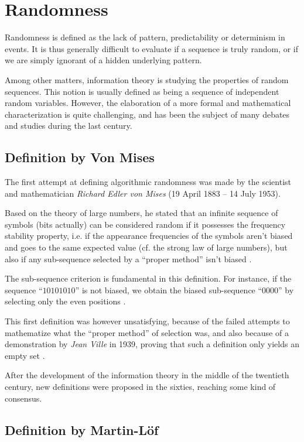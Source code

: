 \documentclass{llncs}
\begin{document}
\section{Randomness}
\label{sec:rand}


Randomness is defined as the lack of pattern, predictability or determinism in events. It is thus generally difficult to evaluate if a sequence is truly random, or if we are simply ignorant of a hidden underlying pattern.

Among other matters, information theory is studying the properties of random sequences. This notion is usually defined as being a sequence of independent random variables. However, the elaboration of a more formal and mathematical characterization is quite challenging, and has been the subject of many debates and studies during the last century.

\subsection{Definition by Von Mises}


The first attempt at defining algorithmic randomness was made by the scientist and mathematician \emph{Richard Edler von Mises} (19 April 1883 – 14 July 1953).

Based on the theory of large numbers, he stated that an infinite sequence of symbols (bits actually) can be considered random if it possesses the frequency stability property, i.e. if the appearance frequencies of the symbols aren't biased and goes to the same expected value (cf. the strong law of large numbers), but also if any sub-sequence selected by a ``proper method'' isn't biased \cite{down}.

The sub-sequence criterion is fundamental in this definition. For instance, if the sequence “$10101010$” is not biased, we obtain the biased sub-sequence “$0000$” by selecting only the even positions \cite{down}.

This first definition was however unsatisfying, because of the failed attempts to mathematize what the “proper method” of selection was, and also because of a demonstration by \emph{Jean Ville} in 1939, proving that such a definition only yields an empty set \cite{down}.

After the development of the information theory in the middle of the twentieth century, new definitions were proposed in the sixties, reaching some kind of consensus.

\subsection{Definition by Martin-L\"{o}f}
\end{document}
